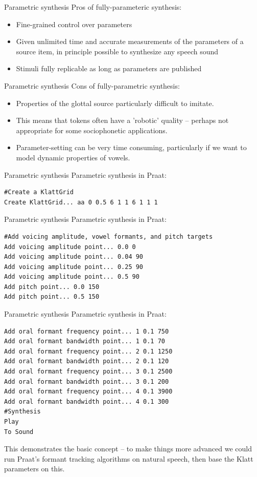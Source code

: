\documentclass{beamer}
\begin{document}
\begin{frame}{Parametric synthesis}
Pros of fully-parameteric synthesis:
\begin{itemize}
\item{Fine-grained control over parameters}
\item{Given unlimited time and accurate measurements of the parameters of a source item, in principle possible to synthesize any speech sound}
\item{Stimuli fully replicable as long as parameters are published}
\end{itemize}
\end{frame}
\begin{frame}{Parametric synthesis}
Cons of fully-parametric synthesis:
\begin{itemize}
\item{Properties of the glottal source particularly difficult to imitate.}
\item{This means that tokens often have a 'robotic' quality -- perhaps not appropriate for some sociophonetic applications.}
\item{Parameter-setting can be very time consuming, particularly if we want to model dynamic properties of vowels.}
\end{itemize}
\end{frame}
\begin{frame}[fragile]{Parametric synthesis}
Parametric synthesis in Praat:
\begin{lstlisting}
#Create a KlattGrid
Create KlattGrid... aa 0 0.5 6 1 1 6 1 1 1
\end{lstlisting}
\end{frame}
\begin{frame}[fragile]{Parametric synthesis}
Parametric synthesis in Praat:
\begin{lstlisting}
#Add voicing amplitude, vowel formants, and pitch targets
Add voicing amplitude point... 0.0 0
Add voicing amplitude point... 0.04 90
Add voicing amplitude point... 0.25 90
Add voicing amplitude point... 0.5 90
Add pitch point... 0.0 150
Add pitch point... 0.5 150
\end{lstlisting}
\end{frame}
\begin{frame}[fragile]{Parametric synthesis}
Parametric synthesis in Praat:
\begin{lstlisting}
Add oral formant frequency point... 1 0.1 750
Add oral formant bandwidth point... 1 0.1 70
Add oral formant frequency point... 2 0.1 1250
Add oral formant bandwidth point... 2 0.1 120
Add oral formant frequency point... 3 0.1 2500
Add oral formant bandwidth point... 3 0.1 200
Add oral formant frequency point... 4 0.1 3900
Add oral formant bandwidth point... 4 0.1 300
#Synthesis
Play
To Sound
\end{lstlisting}
This demonstrates the basic concept -- to make things more advanced we could run Praat's formant tracking algorithms on natural speech, then base the Klatt parameters on this.
\end{frame}
\end{document}

